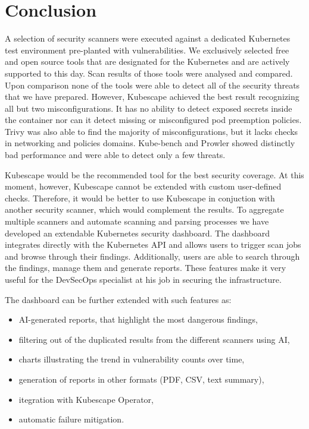 \chapter*{Conclusion}
\label{chap:conclusion}

A selection of security scanners were executed against a dedicated Kubernetes test environment pre-planted with vulnerabilities. We exclusively selected free and open source tools that are designated for the Kubernetes and are actively supported to this day. Scan results of those tools were analysed and compared. Upon comparison none of the tools were able to detect all of the security threats that we have prepared. However, Kubescape achieved the best result recognizing all but two misconfigurations. It has no ability to detect exposed secrets inside the container nor can it detect missing or misconfigured pod preemption policies. Trivy was also able to find the majority of misconfigurations, but it lacks checks in networking and policies domains. Kube-bench and Prowler showed distinctly bad performance and were able to detect only a few threats.

Kubescape would be the recommended tool for the best security coverage. At this moment, however, Kubescape cannot be extended with custom user-defined checks. Therefore, it would be better to use Kubescape in conjuction with another security scanner, which would complement the results. To aggregate multiple scanners and automate scanning and parsing processes we have developed an extendable Kubernetes security dashboard. The dashboard integrates directly with the Kubernetes API and allows users to trigger scan jobs and browse through their findings. Additionally, users are able to search through the findings, manage them and generate reports. These features make it very useful for the DevSecOps specialist at his job in securing the infrastructure.

The dashboard can be further extended with such features as:
\begin{itemize}[noitemsep,nosep]
    \item AI-generated reports, that highlight the most dangerous findings,
    \item filtering out of the duplicated results from the different scanners using AI,
    \item charts illustrating the trend in vulnerability counts over time,
    \item generation of reports in other formats (PDF, CSV, text summary),
    \item itegration with Kubescape Operator,
    \item automatic failure mitigation.
\end{itemize}